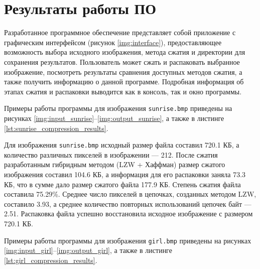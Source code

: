 \section{Результаты работы ПО}

Разработанное программное обеспечение представляет собой приложение с графическим интерфейсом (рисунок \ref{img:interface}), предоставляющее возможность выбора исходного изображения, метода сжатия и директории для сохранения результатов. Пользователь может сжать и распаковать выбранное изображение, посмотреть результаты сравнения доступных методов сжатия, а также получить информацию о данной программе.
Подробная информация об этапах сжатия и распаковки выводится как в консоль, так и окно программы.


\clearpage

Примеры работы программы для изображения \texttt{sunrise.bmp} приведены на рисунках \ref{img:input_sunrise}--\ref{img:output_sunrise}, а также в листинге \ref{lst:sunrise_compression_results}.





Для изображения \texttt{sunrise.bmp} исходный размер файла составил 720.1 КБ, а количество различных пикселей в изображении --- 212. После сжатия разработанным гибридным методом (LZW + Хаффман) размер сжатого изображения составил 104.6 КБ, а информация для его распаковки заняла 73.3 КБ, что в сумме дало размер сжатого файла 177.9 КБ. Степень сжатия файла составила 75.29\%. Среднее число пикселей в цепочках, созданных методом LZW, составило 3.93, а среднее количество повторных использований цепочек байт --- 2.51. Распаковка файла успешно восстановила исходное изображение с размером 720.1 КБ.

\clearpage

Примеры работы программы для изображения \texttt{girl.bmp} приведены на рисунках \ref{img:input_girl}--\ref{img:output_girl}, а также в листинге \ref{lst:girl_compression_results}.

